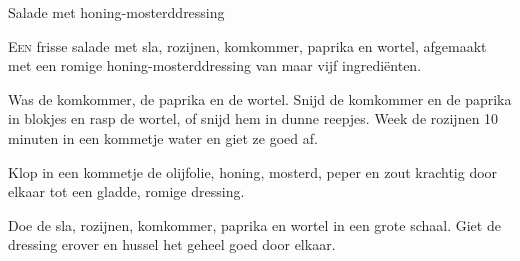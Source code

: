 \begin{recipe}{Salade met honing-mosterddressing}


\lettrine{E}{en} frisse salade met sla, rozijnen, komkommer, paprika en
wortel, afgemaakt met een romige honing-mosterddressing van maar vijf
ingrediënten.

\begin{ingredients}
\end{ingredients}

\begin{steps}
  \item Was de komkommer, de paprika en de wortel. Snijd de komkommer en de
        paprika in blokjes en rasp de wortel, of snijd hem in dunne
        reepjes. Week de rozijnen 10 minuten in een kommetje water en giet
        ze goed af.
  \item Klop in een kommetje de olijfolie, honing, mosterd, peper en zout
        krachtig door elkaar tot een gladde, romige dressing.
  \item Doe de sla, rozijnen, komkommer, paprika en wortel in een grote
        schaal. Giet de dressing erover en hussel het geheel goed door
        elkaar.
\end{steps}

\end{recipe}
